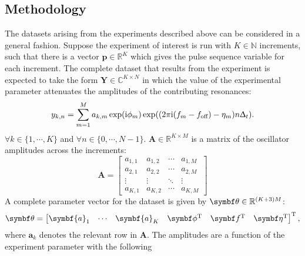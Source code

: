 
\subsection{Methodology}


The datasets arising from the experiments described above can be considered in
a general fashion.
Suppose the experiment of interest is run with $K \in \mathbb{N}$ increments,
such that there is a vector  $\symbf{p} \in \mathbb{R}^K$ which gives the
pulse sequence variable for each increment.
The complete dataset that results from the experiment is expected to take the
form $\symbf{Y} \in \mathbb{C}^{K \times N}$ in which the value of the
experimental parameter attenuates the amplitudes of the contributing
resonances:
\begin{equation}
    y_{k,n} = \sum_{m=1}^{M} a_{k,m} \exp(\mathrm{i} \phi_m)
    \exp((2 \pi \mathrm{i} (f_m - f_{\text{off}}) - \eta_m) n \Updelta_t).
\end{equation}
$\forall k \in \lbrace 1, \cdots, K \rbrace$ and $\forall n \in \lbrace 0,
\cdots, N-1 \rbrace$.
$\symbf{A} \in \mathbb{R}^{K \times M}$ is a matrix of the oscillator amplitudes
across the increments:
\begin{equation}
    \symbf{A} =
    \begin{bmatrix}
        a_{1,1} & a_{1,2} & \cdots & a_{1,M}\\
        a_{2,1} & a_{2,2} & \cdots & a_{2,M}\\
        \vdots & \vdots & \ddots & \vdots\\
        a_{K,1} & a_{K,2} & \cdots & a_{K,M}
    \end{bmatrix}
\end{equation}
A complete parameter vector for the dataset is given by $\bth \in
\mathbb{R}^{(K + 3)M}$:
\begin{equation}
    \bth =
    \begin{bmatrix}
        \symbf{a}_1 & \cdots & \symbf{a}_K & \bdphi\T & \bdf\T & \bdeta\T
    \end{bmatrix}\T,
\end{equation}
where $\symbf{a}_k$ denotes the relevant row in $\symbf{A}$.
The amplitudes are a function of the experiment parameter with the following

